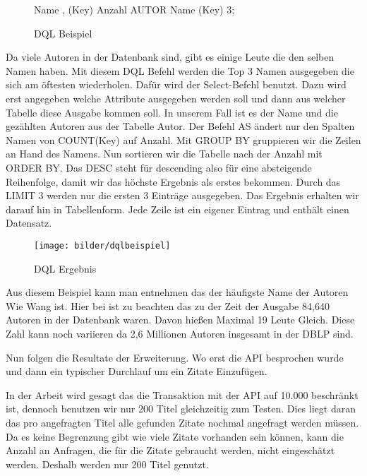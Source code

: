 \begin{figure}[!htb]
	 Name , (Key)  Anzahl  AUTOR\newline
	 Name\newline
	(Key)  \newline
	 3;\newline
	\caption{DQL Beispiel}
	\label{fig:dqlbeispiel}
\end{figure}

Da viele Autoren in der Datenbank sind, gibt es einige Leute die den selben Namen haben. Mit diesem DQL Befehl werden die Top 3 Namen ausgegeben die sich am öftesten wiederholen. Dafür wird der Select-Befehl benutzt. Dazu wird erst angegeben welche Attribute ausgegeben werden soll und dann aus welcher Tabelle diese Ausgabe kommen soll. In unserem Fall ist es der Name und die gezählten Autoren aus der Tabelle Autor. Der Befehl AS ändert nur den Spalten Namen von COUNT(Key) auf Anzahl. Mit GROUP BY gruppieren wir die Zeilen an Hand des Namens. Nun sortieren wir die Tabelle nach der Anzahl mit ORDER BY. Das DESC steht für descending also für eine absteigende Reihenfolge, damit wir das höchste Ergebnis als erstes bekommen. Durch das LIMIT 3 werden nur die ersten 3 Einträge ausgegeben. Das Ergebnis erhalten wir darauf hin in Tabellenform. Jede Zeile ist ein eigener Eintrag und enthält einen Datensatz.

\begin{figure}[!htb]
	\centering
	\texttt{[image: bilder/dqlbeispiel]}
	\caption{DQL Ergebnis}
	\label{fig:dqlergebnis}
\end{figure}

Aus diesem Beispiel kann man entnehmen das der häufigste Name der Autoren Wie Wang ist. Hier bei ist zu beachten das zu der Zeit der Ausgabe 84,640 Autoren in der Datenbank waren. Davon hießen Maximal 19 Leute Gleich. Diese Zahl kann noch variieren da 2,6 Millionen Autoren insgesamt in der DBLP sind.

Nun folgen die Resultate der Erweiterung. Wo erst die API besprochen wurde und dann ein typischer Durchlauf um ein Zitate Einzufügen.

In der Arbeit wird gesagt das die Transaktion mit der API auf 10.000 beschränkt ist, dennoch benutzen wir nur 200 Titel gleichzeitig zum Testen. Dies liegt daran das pro angefragten Titel alle gefunden Zitate nochmal angefragt werden müssen. Da es keine Begrenzung gibt wie viele Zitate vorhanden sein können, kann die Anzahl an Anfragen, die für die Zitate gebraucht werden, nicht eingeschätzt werden. Deshalb werden nur 200 Titel genutzt.

